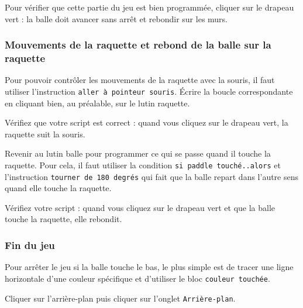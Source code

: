 
Pour vérifier que cette partie du jeu est bien programmée, cliquer sur le drapeau vert : la balle doit avancer sans arrêt et rebondir sur les murs.




\subsubsection{Mouvements de la raquette et rebond de la balle sur la raquette}

Pour pouvoir contrôler les mouvements de la raquette avec la souris, il faut utiliser l'instruction \texttt{aller à pointeur souris}. Écrire la boucle correspondante en cliquant bien, au préalable, sur le lutin raquette.


Vérifiez que votre script est correct : quand vous cliquez sur le drapeau vert, la raquette suit la souris.

Revenir au lutin balle pour programmer ce qui se passe quand il touche la raquette. Pour cela, il faut utiliser la condition \texttt{si paddle touché..alors} et l'instruction \texttt{tourner de 180 degrés} qui fait que la balle repart dans l'autre sens quand elle touche la raquette.


Vérifiez votre script : quand vous cliquez sur le drapeau vert et que la balle touche la raquette, elle rebondit.

\subsubsection{Fin du jeu}

Pour arrêter le jeu si la balle touche le bas, le plus simple est de tracer une ligne horizontale d'une couleur spécifique et d'utiliser le bloc \texttt{couleur touchée}.

Cliquer sur l'arrière-plan puis cliquer sur l'onglet \texttt{Arrière-plan}.

